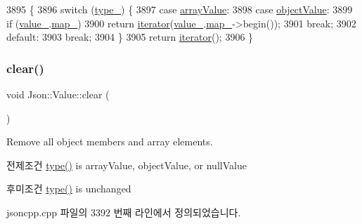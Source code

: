 \begin{DoxyCode}
3895                            \{
3896   \textcolor{keywordflow}{switch} (\hyperlink{class_json_1_1_value_abd222c2536dc88bf330dedcd076d2356}{type\_}) \{
3897   \textcolor{keywordflow}{case} \hyperlink{namespace_json_a7d654b75c16a57007925868e38212b4eadc8f264f36b55b063c78126b335415f4}{arrayValue}:
3898   \textcolor{keywordflow}{case} \hyperlink{namespace_json_a7d654b75c16a57007925868e38212b4eae8386dcfc36d1ae897745f7b4f77a1f6}{objectValue}:
3899     \textcolor{keywordflow}{if} (\hyperlink{class_json_1_1_value_aef578244546212705b9f81eb84d7e151}{value\_}.\hyperlink{union_json_1_1_value_1_1_value_holder_a1e7a5b86d4f52234f55c847ad1ce389a}{map\_})
3900       \textcolor{keywordflow}{return} \hyperlink{class_json_1_1_value_a341cdf2e01f8b3c5b7317aa2f0768c53}{iterator}(\hyperlink{class_json_1_1_value_aef578244546212705b9f81eb84d7e151}{value\_}.\hyperlink{union_json_1_1_value_1_1_value_holder_a1e7a5b86d4f52234f55c847ad1ce389a}{map\_}->begin());
3901     \textcolor{keywordflow}{break};
3902   \textcolor{keywordflow}{default}:
3903     \textcolor{keywordflow}{break};
3904   \}
3905   \textcolor{keywordflow}{return} \hyperlink{class_json_1_1_value_a341cdf2e01f8b3c5b7317aa2f0768c53}{iterator}();
3906 \}
\end{DoxyCode}
\mbox{\label{class_json_1_1_value_a501a4d67e6c875255c2ecc03ccd2019b}} 
\subsubsection{\texorpdfstring{clear()}{clear()}}
{\footnotesize\ttfamily void Json\+::\+Value\+::clear (\begin{DoxyParamCaption}{ }\end{DoxyParamCaption})}

Remove all object members and array elements. \begin{DoxyPrecond}{전제조건}
\hyperlink{class_json_1_1_value_a8ce61157a011894f0252ceed232312de}{type()} is array\+Value, object\+Value, or null\+Value 
\end{DoxyPrecond}
\begin{DoxyPostcond}{후미조건}
\hyperlink{class_json_1_1_value_a8ce61157a011894f0252ceed232312de}{type()} is unchanged 
\end{DoxyPostcond}


jsoncpp.\+cpp 파일의 3392 번째 라인에서 정의되었습니다.


